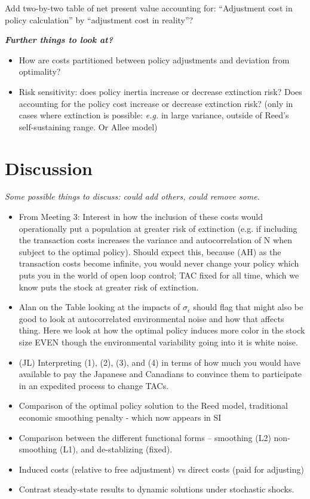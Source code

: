 \documentclass[authoryear, review, 12pt]{elsarticle}
\newcommand{\cdb}[1]{{\it \color{darkgreen} #1}}
\begin{document}
Add two-by-two table of net present value accounting for:  ``Adjustment cost in policy calculation'' by ``adjustment cost in reality''?

\cdb{\textbf{Further things to look at?}
\begin{itemize}
  \item How are costs partitioned between policy adjustments and deviation from optimality? 
  \item Risk sensitivity: does policy inertia increase or decrease extinction risk? Does accounting for the policy cost increase or decrease extinction risk?  (only in cases where extinction is possible: \emph{e.g.} in large variance, outside of Reed's self-sustaining range.  Or Allee model)
\end{itemize}
}


\section{Discussion}
\cdb{Some possible things to discuss: could add others, could remove some.}
\begin{itemize}
\item From Meeting 3: Interest in how the inclusion of these costs would operationally put a population at greater risk of extinction (e.g. if including the transaction costs increases the variance and autocorrelation of N when subject to the optimal policy). Should expect this, because (AH) as the transaction costs become infinite, you would never change your policy which puts you in the world of open loop control; TAC fixed for all time, which we know puts the stock at greater risk of extinction.
\item Alan on the Table looking at the impacts of $\sigma_{\epsilon}$ should flag that might also be good to look at autocorrelated environmental noise and how that affects thing. Here we look at how the optimal policy induces more color in the stock size EVEN though the environmental variability going into it is white noise.
\item (JL) Interpreting  (1), (2), (3), and (4) in terms of how much you would have available to pay the Japanese and Canadians to convince them to participate in an expedited process to change TACs.
\item   Comparison of the optimal policy solution to the Reed model, traditional economic smoothing penalty - which now appears in SI
\item  Comparison between the different functional forms -- smoothing (L2)
  non-smoothing (L1), and de-stablizing (fixed).
\item   Induced costs (relative to free adjustment) vs direct costs (paid for adjusting) 
\item   Contrast steady-state results to dynamic solutions under stochastic shocks.
\end{itemize}
\end{document}
